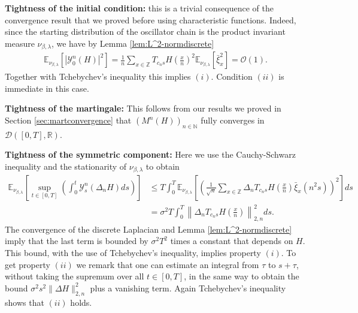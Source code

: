 \documentclass[a4paper, reqno, 12pt]{amsart}
\theoremstyle{plain}
\theoremstyle{definition}
\newcommand{\ee}[1]{\mathbb{E}_{\nu_{\beta,\lambda}}\left[ #1 \right]}
\newcommand{\R}{\mathbb{R}}
\newcommand{\Z}{\mathbb{Z}}
\begin{document}
\medskip
\textbf{Tightness of the initial condition:} this is a trivial consequence of the convergence result that we proved before using characteristic functions. Indeed, since the starting distribution of the oscillator chain is the product invariant measure $\nu_{\beta,\lambda}$, we have by Lemma \ref{lem:L^2-normdiscrete}
\begin{align*}
    \ee{|\mathcal{Y}^n_0(H)|^2} = \frac{1}{n} \sum_{x\in\Z} T_{c_ns}H\left(\frac{x}{n}\right)^2  \ee{\bar{\xi}_x^2} = \mathcal O (1).
\end{align*}
Together with Tchebychev's inequality this implies $(i)$. Condition $(ii)$ is immediate in this case.

\medskip
\textbf{Tightness of the martingale:} This follows from our results we proved in Section \ref{sec:martconvergence} that $(M^n(H))_{n\in\mathbb N}$ fully converges in $\mathcal{D}([0,T],\R)$.

\medskip
\textbf{Tightness of the symmetric component:} Here we use the Cauchy-Schwarz inequality and the stationarity of $\nu_{\beta,\lambda}$ to obtain
\begin{align*} \label{eq:tightsymmetric}
    \ee{\sup_{t\in[0,T]}\left(\int_0^t \mathcal{Y}^n_s(\Delta_n H) ds\right)} &\leq T \int_0^T \ee{\left(\frac{1}{\sqrt{n}}\sum_{x\in\Z} \Delta_n T_{c_ns}H\left(\frac{x}{n}\right) \bar{\xi}_x(n^2s)  \right)^2 }ds \nonumber \\
    & = \sigma^2T\int_0^T \left\| \Delta_n T_{c_ns}H\left(\frac{x}{n}\right)\right\|^2_{2,n} ds.
\end{align*}
The convergence of the discrete Laplacian and Lemma \ref{lem:L^2-normdiscrete} imply that the last term is bounded by $\sigma^2T^2$ times a constant that depends on $H$.
This bound, with the use of Tchebychev's inequality, implies property $(i)$.
To get property $(ii)$ we remark that one can estimate an integral from $\tau$ to $s+\tau$, without taking the supremum over all $t\in[0,T]$,  in the same way to obtain the bound $\sigma^2 s^2 \|\Delta H\|_{2,n}^2$ plus a vanishing term. Again Tchebychev's inequality shows that $(ii)$ holds.
\medskip
\end{document}
